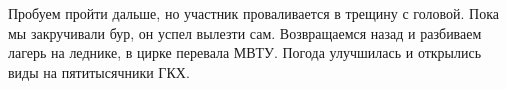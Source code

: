 Пробуем пройти дальше, но участник проваливается в трещину с головой. Пока мы закручивали бур, он успел вылезти сам. Возвращаемся назад и разбиваем лагерь на леднике, в цирке перевала МВТУ. Погода улучшилась и открылись виды на пятитысячники ГКХ.












    \FloatBarrier

